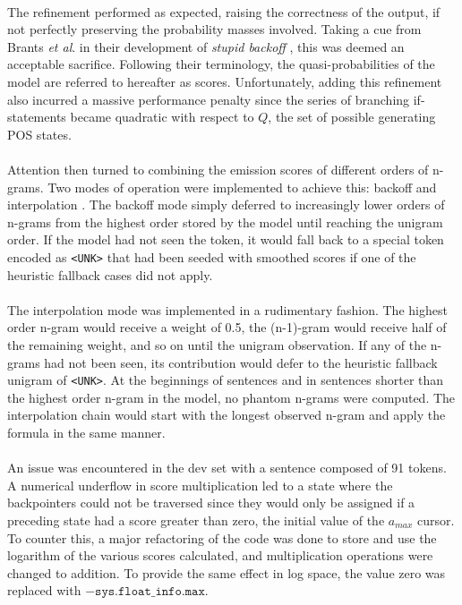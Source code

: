 \documentclass[11pt,a4paper]{article}
\begin{document}
\paragraph{}
The refinement performed as expected, raising the correctness of the output, if not
perfectly preserving the probability masses involved. Taking a cue from Brants \emph{et al}.
in their development of \emph{stupid backoff} , this was deemed
an acceptable sacrifice. Following their terminology, the quasi-probabilities of the model
are referred to hereafter as scores. Unfortunately, adding this refinement also incurred a massive
performance penalty since the series of branching if-statements became quadratic with
respect to $Q$, the set of possible generating POS states.

\paragraph{}
Attention then turned to combining the emission scores of different orders of n-grams.
Two modes of operation were implemented to achieve this: backoff and interpolation \cite[49-50]{JurafskyMartin}.
The backoff mode simply deferred to increasingly lower orders of n-grams from the
highest order stored by the model until reaching the unigram order.
If the model had not seen the token, it would fall back to a special token
encoded as \texttt{<UNK>} that had been seeded with smoothed scores if one
of the heuristic fallback cases did not apply.

\paragraph{}
The interpolation mode was implemented in a rudimentary fashion. The highest order n-gram
would receive a weight of 0.5, the (n-1)-gram would receive half of the remaining weight,
and so on until the unigram observation. If any of the n-grams had not been seen, its
contribution would defer to the heuristic fallback unigram of \texttt{<UNK>}.
At the beginnings of sentences and in sentences shorter than the highest order n-gram
in the model, no phantom n-grams were computed. The interpolation chain would start with
the longest observed n-gram and apply the formula in the same manner.

\paragraph{}
An issue was encountered in the dev set with a sentence composed of 91 tokens. A numerical
underflow in score multiplication led to a state where the backpointers could not be
traversed since they would only be assigned if a preceding state had a score greater than zero,
the initial value of the $a_{max}$ cursor. To counter this, a major refactoring
of the code was done to store and use the logarithm of the various scores calculated,
and multiplication operations were changed to addition. To provide the same effect in log
space, the value zero was replaced with $-\texttt{sys.float\_info.max}$.
\end{document}
